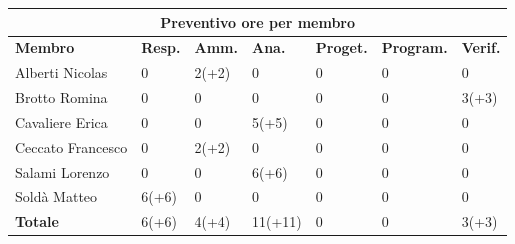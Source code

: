 \documentclass[a4paper, 12pt]{article}
\begin{document}
\begin{center}
	\begin{tabularx}{\textwidth}{|X|X|X|X|X|X|X|}
		\hline
		\multicolumn{7}{|c|}{\textbf{Preventivo ore per membro}}                                \\
		\hline
		\hline
		\textbf{Membro}   & \textbf{Resp.}    & \textbf{Amm.}   & \textbf{Ana.} &
		\textbf{Proget.}  & \textbf{Program.} & \textbf{Verif.}                                 \\
		\hline
		Alberti Nicolas   & 0                 & 2(+2)           & 0             & 0 & 0 & 0     \\
		\hline
		Brotto Romina     & 0                 & 0               & 0             & 0 & 0 & 3(+3) \\
		\hline
		Cavaliere Erica   & 0                 & 0               & 5(+5)         & 0 & 0 & 0     \\
		\hline
		Ceccato Francesco & 0                 & 2(+2)           & 0             & 0 & 0 & 0     \\
		\hline
		Salami Lorenzo    & 0                 & 0               & 6(+6)         & 0 & 0 & 0     \\
		\hline
		Soldà Matteo      & 6(+6)             & 0               & 0             & 0 & 0 & 0     \\
		\hline
		\hline
		\textbf{Totale}   & 6(+6)             & 4(+4)           & 11(+11)       & 0 & 0 & 3(+3) \\
		\hline
	\end{tabularx}\\[8pt]
	\mbox{}\\
\end{center}

\newpage
\end{document}
